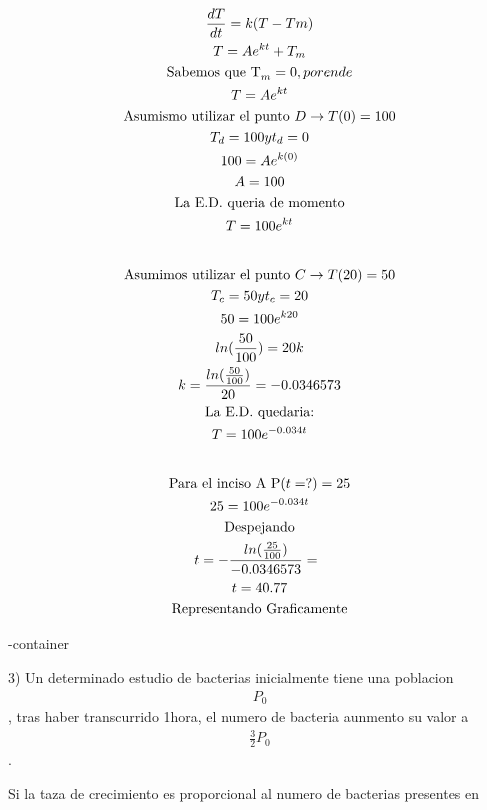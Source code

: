 \documentclass{article}
\begin{document}
\begin{gather*}
\frac{dT}{dt} = k(T-Tm) \\
T = Ae^{kt}+T_{m} \\
\text{Sabemos que T}_{m} = 0, por ende \\
T = Ae^{kt} \\
\text{Asumismo utilizar el punto }D \rightarrow  T(0)=100 \\
T_{d} = 100 y t_{d}=0 \\
100 = Ae^{k(0)} \\
A = 100 \\
\text{La E.D. queria de momento} \\
T = 100e^{kt} \\
\vspace{0.5em} \\
\text{Asumimos utilizar el punto }C  \rightarrow  T(20) =50 \\
T_{c} = 50 y t_{c}=20 \\
50 = 100e^{k20} \\
ln(\frac{50}{100}) = 20k \\
k = \frac{ln(\frac{50}{100})}{20} =-0.0346573 \\
\text{La E.D. quedaria:} \\
T = 100e^{-0.034t} \\
\vspace{0.5em} \\
\text{Para el inciso A  P}(t=?) = 25 \\
25 = 100e^{-0.034t} \\
\text{Despejando} \\
t =-\frac{ln(\frac{25}{100})}{-0.0346573}  = \frac{}{} \\
t = 40.77 \\
\text{Representando Graficamente}
\end{gather*}




\image-container



3) Un determinado estudio de bacterias inicialmente tiene una poblacion 
\begin{gather*}
P_{0}
\end{gather*}
, tras haber transcurrido 1hora, el numero de bacteria aunmento su valor a 
\begin{gather*}
\frac{3}{2}P_{0}
\end{gather*}
.

Si  la taza de crecimiento  es proporcional al numero de bacterias presentes en 
\end{document}
